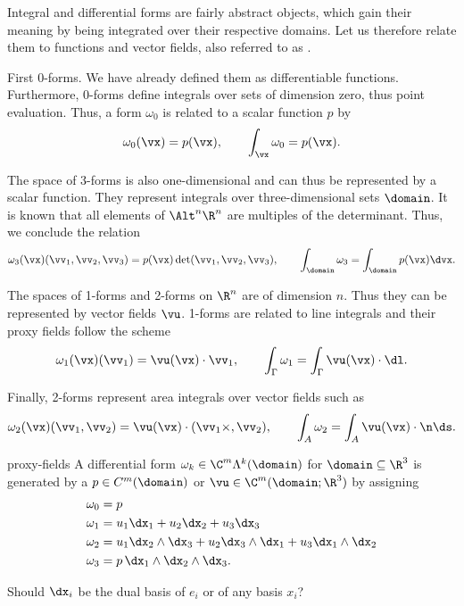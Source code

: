 \begin{remark}
  \label{remark:proxy-fields}
  Integral and differential forms are fairly abstract objects, which
  gain their meaning by being integrated over their respective
  domains. Let us therefore relate them to functions and vector
  fields, also referred to as .

  First 0-forms. We have already defined them as differentiable
  functions. Furthermore, 0-forms define integrals over sets of
  dimension zero, thus point evaluation.
  Thus, a form $\omega_0$ is related to a scalar function $p$ by
  \begin{gather}
    \omega_0(\vx) = p(\vx),\qquad \int_\vx \omega_0 = p(\vx).
  \end{gather}

  The space of 3-forms is also one-dimensional and can thus be
  represented by a scalar function. They represent integrals over
  three-dimensional sets $\domain$. It is known that all elements of
  $\Alt^n\R^n$ are multiples of the determinant. Thus, we conclude the
  relation
  \begin{gather}
    \omega_3(\vx)(\vv_1,\vv_2,\vv_3) = p(\vx) \det(\vv_1,\vv_2,\vv_3)
    ,\qquad \int_\domain \omega_3 = \int_\domain p(\vx) \dvx.
  \end{gather}

  The spaces of 1-forms and 2-forms on $\R^n$ are of dimension
  $n$. Thus they can be represented by vector fields $\vu$. 1-forms are
  related to line integrals and their proxy fields follow the scheme
  \begin{gather}
    \omega_1(\vx)(\vv_1) = \vu(\vx) \cdot \vv_1
    ,\qquad \int_\Gamma \omega_1 = \int_\Gamma \vu(\vx) \cdot \dl.
  \end{gather}

  Finally, 2-forms represent area integrals over vector fields such as
  \begin{gather}
    \omega_2(\vx)(\vv_1,\vv_2) = \vu(\vx) \cdot (\vv_1 \times ,\vv_2)
    ,\qquad \int_A \omega_2 = \int_A \vu(\vx) \cdot \n \ds.
  \end{gather}
\end{remark}

\begin{Definition}{proxy-fields}
  A differential form $\omega_k \in \C^m\Lambda^k(\domain)$ for
  $\domain \subseteq \R^3$ is generated by a 
  $p\in C^m(\domain)$ or $\vu\in\C^m(\domain;\R^3)$ by assigning
  \begin{align}
    \omega_0 &= p\\
    \omega_1 &= u_1 \dx_1 + u_2 \dx_2 + u_3 \dx_3\\
    \omega_2 &= u_1 \dx_2\wedge \dx_3 + u_2 \dx_3 \wedge \dx_1 + u_3 \dx_1 \wedge \dx_2\\
    \omega_3 &= p \, \dx_1 \wedge \dx_2 \wedge \dx_3.
  \end{align}
\end{Definition}
\begin{todo}
  Should $\dx_i$ be the dual basis of $e_i$ or of any basis $x_i$?
\end{todo}


